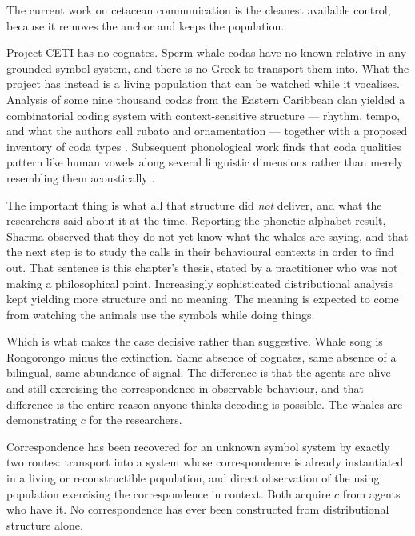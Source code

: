 The current work on cetacean communication is the cleanest
available control, because it removes the anchor and keeps the
population.

Project CETI has no cognates.
Sperm whale codas have no known relative in any grounded symbol
system, and there is no Greek to transport them into.
What the project has instead is a living population that can be
watched while it vocalises.
Analysis of some nine thousand codas from the Eastern Caribbean
clan yielded a combinatorial coding system with context-sensitive
structure --- rhythm, tempo, and what the authors call rubato and
ornamentation --- together with a proposed inventory of coda types
\cite{sharma2024}.
Subsequent phonological work finds that coda qualities pattern like
human vowels along several linguistic dimensions rather than merely
resembling them acoustically \cite{begus2026}.

The important thing is what all that structure did \emph{not}
deliver, and what the researchers said about it at the time.
Reporting the phonetic-alphabet result, Sharma observed that they
do not yet know what the whales are saying, and that the next step
is to study the calls in their behavioural contexts in order to
find out.
That sentence is this chapter's thesis, stated by a practitioner
who was not making a philosophical point.
Increasingly sophisticated distributional analysis kept yielding
more structure and no meaning.
The meaning is expected to come from watching the animals use the
symbols while doing things.

Which is what makes the case decisive rather than suggestive.
Whale song is Rongorongo minus the extinction.
Same absence of cognates, same absence of a bilingual, same
abundance of signal.
The difference is that the agents are alive and still exercising
the correspondence in observable behaviour, and that difference is
the entire reason anyone thinks decoding is possible.
The whales are demonstrating $c$ for the researchers.

\begin{observation}
\label{obs:transport}
Correspondence has been recovered for an unknown symbol system by
exactly two routes: transport into a system whose correspondence is
already instantiated in a living or reconstructible population, and
direct observation of the using population exercising the
correspondence in context.
Both acquire $c$ from agents who have it.
No correspondence has ever been constructed from distributional
structure alone.
\end{observation}

